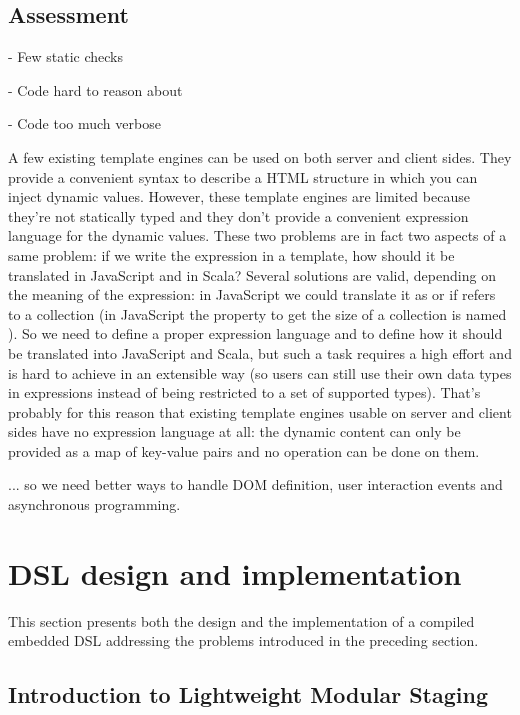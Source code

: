 \documentclass[american,english,runningheads]{llncs}
\begin{document}
\subsection{Assessment}

- Few static checks

- Code hard to reason about

- Code too much verbose

A few existing template engines can be used on both server and client sides. They provide a convenient syntax to describe a HTML structure in which you can inject dynamic values. However, these template engines are limited because they’re not statically typed and they don’t provide a convenient expression language for the dynamic values. These two problems are in fact two aspects of a same problem: if we write the expression  in a template, how should it be translated in JavaScript and in Scala? Several solutions are valid, depending on the meaning of the expression: in JavaScript we could translate it as  or  if  refers to a collection (in JavaScript the property to get the size of a collection is named ). So we need to define a proper expression language and to define how it should be translated into JavaScript and Scala, but such a task requires a high effort and is hard to achieve in an extensible way (so users can still 
use their own data types in expressions instead of being restricted to a set of supported types). That’s probably for this reason that existing template engines usable on server and client sides have no expression language at all: the dynamic content can only be provided as a map of key-value pairs and no operation can be done on them.

... so we need better ways to handle DOM definition, user interaction events and asynchronous programming.

\section{DSL design and implementation}

This section presents both the design and the implementation of a compiled embedded DSL addressing the problems introduced in the preceding section.

\subsection{Introduction to Lightweight Modular Staging}
\label{intro-lms}
\end{document}
